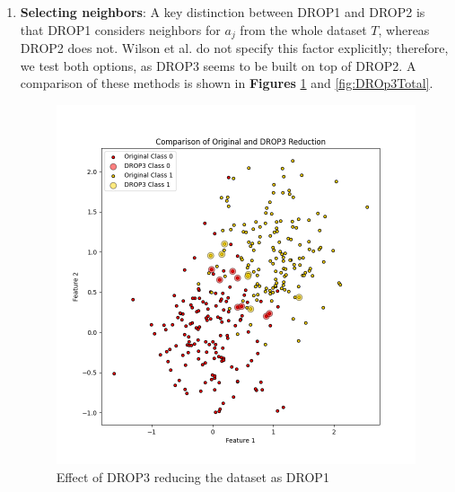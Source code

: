 \begin{enumerate}
	\item \textbf{Selecting neighbors}: A key distinction between DROP1 and DROP2 is that DROP1 considers neighbors for $ a_j $ from the whole dataset $ T $, whereas DROP2 does not. Wilson et al. \cite{wilson1972asymptotic} do not specify this factor explicitly; therefore, we test both options, as DROP3 seems to be built on top of DROP2. A comparison of these methods is shown in \textbf{Figures} \ref{fig:DROP3Reduciendo} and \ref{fig:DROp3Total}.
	
	\begin{figure}[ht]
		\centering
		\begin{minipage}{0.45\textwidth}
			\centering
			\includegraphics[width=\textwidth]{figures/DROP3Reduciendo} %
			\caption{Effect of DROP3 reducing the dataset as DROP1}
			\label{fig:DROP3Reduciendo}
		\end{minipage}\hfill
		\begin{minipage}{0.45\textwidth}
			\centering

\end{minipage}
\end{figure}
\end{enumerate}
